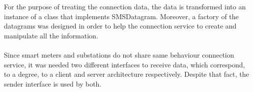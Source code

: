 
For the purpose of treating the connection data, the data is transformed into an instance of a class that implements SMSDatagram. Moreover, a factory of the datagrams was designed in order to help the connection service to create and manipulate all the information.\\
\\
Since smart meters and substations do not share same behaviour connection service, it was needed two different interfaces to receive data, which correspond, to a degree, to a client and server architecture respectively. Despite that fact, the sender interface is used by both.
